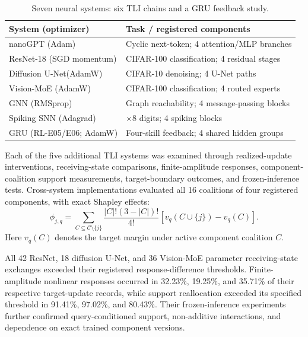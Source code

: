 \documentclass[10pt,twocolumn,letterpaper]{article}
\begin{document}
\begin{table}[t]
\centering\small\setlength{\tabcolsep}{3pt}\renewcommand{\arraystretch}{1.07}
\begin{tabular}{@{}>{\raggedright\arraybackslash}p{}>{\raggedright\arraybackslash}p{}@{}}
\toprule
System (optimizer) & Task / registered components\\
\midrule
nanoGPT (Adam) & Cyclic next-token; 4 attention/MLP branches\\
ResNet-18 (SGD momentum) & CIFAR-100 classification; 4 residual stages\\
Diffusion U-Net\newline(AdamW) & CIFAR-10 denoising; 4 U-Net paths\\
Vision-MoE (AdamW) & CIFAR-100 classification; 4 routed experts\\
GNN (RMSprop) & Graph reachability; 4 message-passing blocks\\
Spiking SNN (Adagrad) & 8$\times$8 digits; 4 spiking blocks\\
GRU (RL-E05/E06; AdamW) & Four-skill feedback; 4 shared hidden groups\\
\bottomrule
\end{tabular}
\caption{Seven neural systems: six TLI chains and a GRU feedback study.}
\label{tab:systems}
\end{table}

Each of the five additional TLI systems was examined through realized-update interventions, receiving-state comparisons, finite-amplitude responses, component-coalition support measurements, target-boundary outcomes, and frozen-inference tests. Cross-system implementations evaluated all 16 coalitions of four registered components, with exact Shapley effects:
\begin{equation}
 \phi_{j,q}=\!\!\sum_{C\subseteq\mathcal C\setminus\{j\}}
 \frac{|C|!(3-|C|)!}{4!}\left[v_q(C\cup\{j\})-v_q(C)\right].
 \label{eq:shapley}
\end{equation}
Here $v_q(C)$ denotes the target margin under active component coalition $C$.

All 42 ResNet, 18 diffusion U-Net, and 36 Vision-MoE parameter receiving-state exchanges exceeded their registered response-difference thresholds. Finite-amplitude nonlinear responses occurred in 32.23\%, 19.25\%, and 35.71\% of their respective target-update records, while support reallocation exceeded its specified threshold in 91.41\%, 97.02\%, and 80.43\%. Their frozen-inference experiments further confirmed query-conditioned support, non-additive interactions, and dependence on exact trained component versions.
\end{document}
